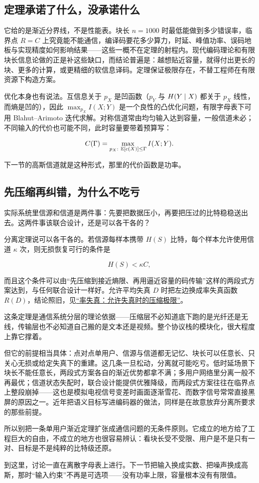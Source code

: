 \subsection{定理承诺了什么，没承诺什么}

它给的是渐近分界线，不是性能表。块长 \(n=1000\) 时最低能做到多少错误率，临界点 \(R=C\) 上究竟能不能通信，编译码要花多少算力，时延、峰值功率、误码地板与实现精度如何影响结果——这些一概不在定理的射程内。现代编码理论和有限块长信息论做的正是补这些缺口，而结论普遍是：越想贴近容量，就得付出更长的块、更多的计算，或更精细的软信息译码。定理保证极限存在，不替工程师在有限资源下构造方案。

优化本身也有说法。互信息关于 \(p_X\) 是凹函数（\(p_Y\) 与 \(H(Y\mid X)\) 都关于 \(p_X\) 线性，而熵是凹的），因此 \(\max_{p_X}I(X;Y)\) 是一个良性的凸优化问题，有限字母表下可用 Blahut--Arimoto 迭代求解。对称信道常由均匀输入达到容量，一般信道未必；不同输入的代价也可能不同，此时容量要带着预算写：

\[
C(\Gamma)=\max_{p_X:\ \E[c(X)]\le\Gamma}I(X;Y).
\]

下一节的高斯信道就是这种形式，那里的代价函数是功率。

\subsection{先压缩再纠错，为什么不吃亏}

实际系统里信源和信道是两件事：先要把数据压小，再要把压过的比特稳稳送出去。这两件事该联合设计，还是可以各干各的？

分离定理说可以各干各的。若信源每样本携带 \(H(S)\) 比特，每个样本允许使用信道 \(\kappa\) 次，则无损恢复可行的条件是

\[
H(S)<\kappa C,
\]

而且这个条件可以由``先压缩到接近熵限、再用逼近容量的码传输''这样的两段式方案达到，与任何联合设计一样好。允许平均失真 \(D\) 时把左边换成率失真函数 \(R(D)\)，结论照旧，见\hyperref[sec:07-Information-Theory/04-Source-Coding/05]{``率失真：允许失真时的压缩极限''}。

这条定理是通信系统分层的理论依据——压缩层不必知道底下跑的是光纤还是无线，传输层也不必知道自己搬的是文本还是视频。整个协议栈的模块化，很大程度上靠它撑着。

但它的前提相当具体：点对点单用户、信源与信道都无记忆、块长可以任意长、只关心无损或给定失真下的重建。这几条一旦松动，分离就可能吃亏。低时延场景下块长不能任意长，两段式方案各自的渐近优势都拿不满；多用户网络里分离一般不再最优；信道状态失配时，联合设计能提供优雅降级，而两段式方案往往在临界点上整段崩掉——这也是模拟电视信号变差时画面逐渐雪花、而数字信号常常直接黑屏的原因之一。近年把语义目标写进编码器的做法，同样是在故意放弃分离所要求的那些前提。

所以别把一条单用户渐近定理扩张成通信问题的无条件原则。它成立的地方给了工程巨大的自由，不成立的地方也很容易辨认：看块长受不受限、用户是不是只有一对、目标是不是纯粹的比特级还原。

到这里，讨论一直在离散字母表上进行。下一节把输入换成实数、把噪声换成高斯，那时``输入约束''不再是可选项——没有功率上限，容量根本没有有限值。
